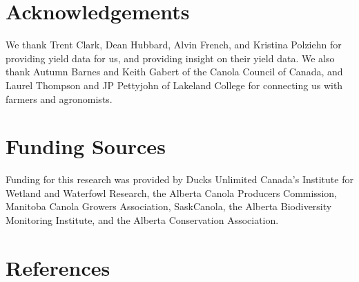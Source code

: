 \documentclass[]{elsarticle} %
\begin{document}
\hypertarget{acknowledgements}{%
\section{Acknowledgements}\label{acknowledgements}}

We thank Trent Clark, Dean Hubbard, Alvin French, and Kristina Polziehn for providing yield data for us, and providing insight on their yield data.
We also thank Autumn Barnes and Keith Gabert of the Canola Council of Canada, and Laurel Thompson and JP Pettyjohn of Lakeland College for connecting us with farmers and agronomists.

\hypertarget{funding-sources}{%
\section{Funding Sources}\label{funding-sources}}

Funding for this research was provided by Ducks Unlimited Canada's Institute for Wetland and Waterfowl Research, the Alberta Canola Producers Commission, Manitoba Canola Growers Association, SaskCanola, the Alberta Biodiversity Monitoring Institute, and the Alberta Conservation Association.

\hypertarget{references}{%
\section*{References}\label{references}}
\end{document}
